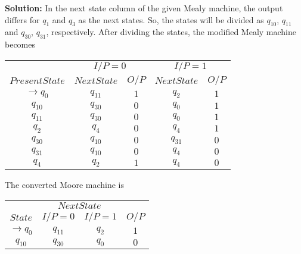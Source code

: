 \documentclass[8pt]{beamer}
\begin{document}
\begin{frame}
\textbf{Solution:} In the next state column of the given Mealy machine, the output differs for $q_1$ and $q_3$ as
the next states. So, the states will be divided as $q_10$, $q_11$ and $q_30$, $q_31$, respectively. After dividing the
states, the modified Mealy machine becomes\\

\begin{center}
\begin{tabular}{ccccc}
 \hline

 \hline

 \hline

 \hline
 &  \multicolumn{2}{c}{$I/P = 0$ } &  \multicolumn{2}{c}{$I/P = 1$}  \\
  \cline{2-3}                         \cline{4-5}
 $Present State$ &   $Next State$  & $O/P$ &  $Next State$  & $O/P$\\
\hline
$\rightarrow q_0$  &  $q_11$  &  $1$  &  $q_2$  & $1$ \\
$q_10$             &  $q_30$  &  $0$  &  $q_0$  & $1$ \\
$q_11$             &  $q_30$  &  $0$  &  $q_0$  & $1$ \\
$q_2$             &  $q_4$    &  $0$  &  $q_4$  & $1$ \\
$q_30$            &  $q_10$   &  $0$  &  $q_31$ & $0$ \\
$q_31$            &  $q_10$   &  $0$  &  $q_4$  & $0$ \\
$q_4$             &  $q_2$    &  $1$  &  $q_4$  & $0$ \\
 \hline

 \hline

 \hline

 \hline
\end{tabular}
\end{center}

\vspace*{0.3cm}
\end{frame}

\begin{frame}
The converted Moore machine is\\

\vspace*{0.3cm}

\begin{center}
\begin{tabular}{cccc}
 \hline

 \hline

 \hline

 \hline
 & \multicolumn{2}{c}{$Next State$ }\\
 \cline{2-3}
 $State$ &  $I/P=0$ & $I/P=1$  &  $O/P$\\
\hline
$\rightarrow q_0$   &    $q_11$   &  $q_2$   &  $1$ \\
$q_10$              &    $q_30$   &  $q_0$   &  $0$ \\

 \hline

\end{tabular}
\end{center}
\end{frame}
\end{document}
